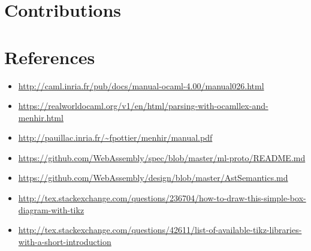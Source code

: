 \documentclass{article}
\begin{document}
\section{Contributions}

\section{References}
\begin{itemize}
  \item \url{http://caml.inria.fr/pub/docs/manual-ocaml-4.00/manual026.html}
  \item \url{https://realworldocaml.org/v1/en/html/parsing-with-ocamllex-and-menhir.html}
  \item \url{http://pauillac.inria.fr/~fpottier/menhir/manual.pdf}
  \item \url{https://github.com/WebAssembly/spec/blob/master/ml-proto/README.md}
  \item \url{https://github.com/WebAssembly/design/blob/master/AstSemantics.md}
\item \url{http://tex.stackexchange.com/questions/236704/how-to-draw-this-simple-box-diagram-with-tikz}
\item \url{http://tex.stackexchange.com/questions/42611/list-of-available-tikz-libraries-with-a-short-introduction}
\end{itemize}
\end{document}
